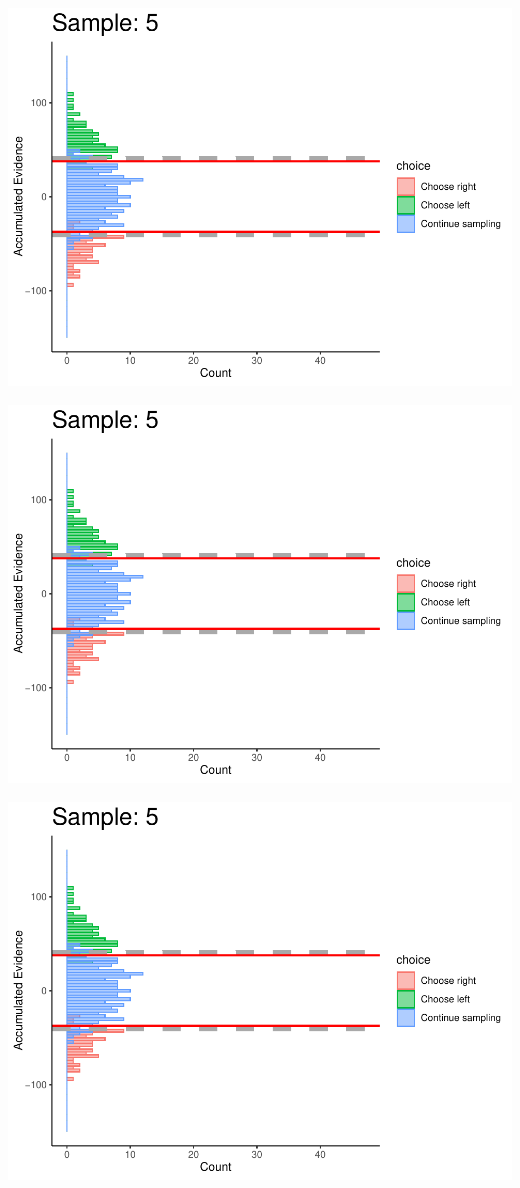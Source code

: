 \documentclass[
]{book}
\begin{document}
\begin{center}\includegraphics[width=0.8\linewidth]{LateNightBayes_files/figure-latex/collapsing_dcb-41} \end{center}

\begin{center}\includegraphics[width=0.8\linewidth]{LateNightBayes_files/figure-latex/collapsing_dcb-42} \end{center}

\begin{center}\includegraphics[width=0.8\linewidth]{LateNightBayes_files/figure-latex/collapsing_dcb-43} \end{center}
\end{document}
